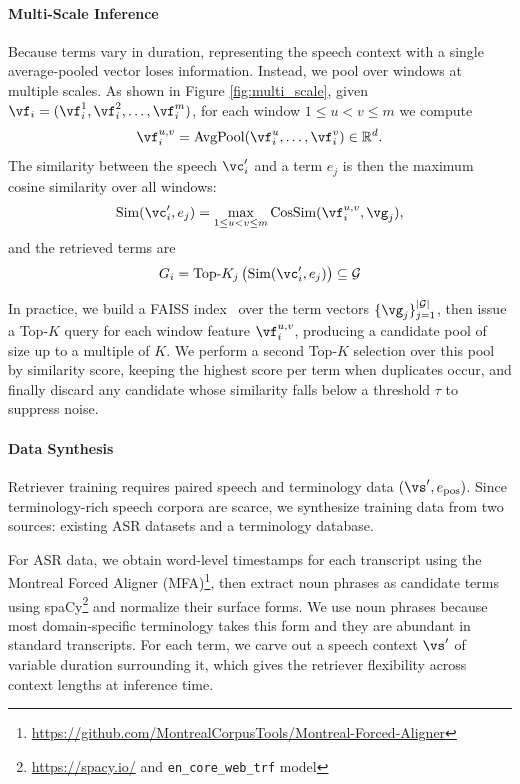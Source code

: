 \paragraph{Multi-Scale Inference}
Because terms vary in duration, representing the speech context with a single average-pooled vector loses information. Instead, we pool over windows at multiple scales. As shown in Figure \ref{fig:multi_scale}, given $\vf_i=(\vf_i^1,\vf_i^2,\ldots,\vf_i^m)$, for each window $1\leq u<v\leq m$ we compute
\begin{equation}
  \vf_i^{u,v} = \text{AvgPool}(\vf_i^u,\ldots,\vf_i^v)\in\mathbb{R}^d.
\end{equation}
The similarity between the speech $\vc_i'$ and a term $e_j$ is then the maximum cosine similarity over all windows:
\begin{equation}
  \text{Sim}(\vc_i',e_j)
  = \max_{1\leq u<v\leq m}
  \text{CosSim}(\vf_i^{u,v},\vg_j),
\end{equation}
and the retrieved terms are
\begin{align}
    G_i = \text{Top-}K_j\left(\text{Sim}(\vc_i',e_j)\right)\subseteq \mathcal{G}
\end{align}

In practice, we build a FAISS index~\citep{douze2024faiss} over the term vectors $\{\vg_j\}_{j=1}^{|\mathcal{G}|}$, then issue a Top-$K$ query for each window feature $\vf_i^{u,v}$, producing a candidate pool of size up to a multiple of $K$. We perform a second Top-$K$ selection over this pool by similarity score, keeping the highest score per term when duplicates occur, and finally discard any candidate whose similarity falls below a threshold $\tau$ to suppress noise.

\paragraph{Data Synthesis} \label{sec:retriever_data} Retriever training requires paired speech and terminology data $(\vs', e_\text{pos})$. Since terminology-rich speech corpora are scarce, we synthesize training data from two sources: existing ASR datasets and a terminology database.

For ASR data, we obtain word-level timestamps for each transcript using the Montreal Forced Aligner (MFA)\footnote{\url{https://github.com/MontrealCorpusTools/Montreal-Forced-Aligner}}, then extract noun phrases as candidate terms using spaCy\footnote{\url{https://spacy.io/} and  \texttt{en\_core\_web\_trf} model} and normalize their surface forms. We use noun phrases because most domain-specific terminology takes this form and they are abundant in standard transcripts. For each term, we carve out a speech context $\vs'$ of variable duration surrounding it, which gives the retriever flexibility across context lengths at inference time.


